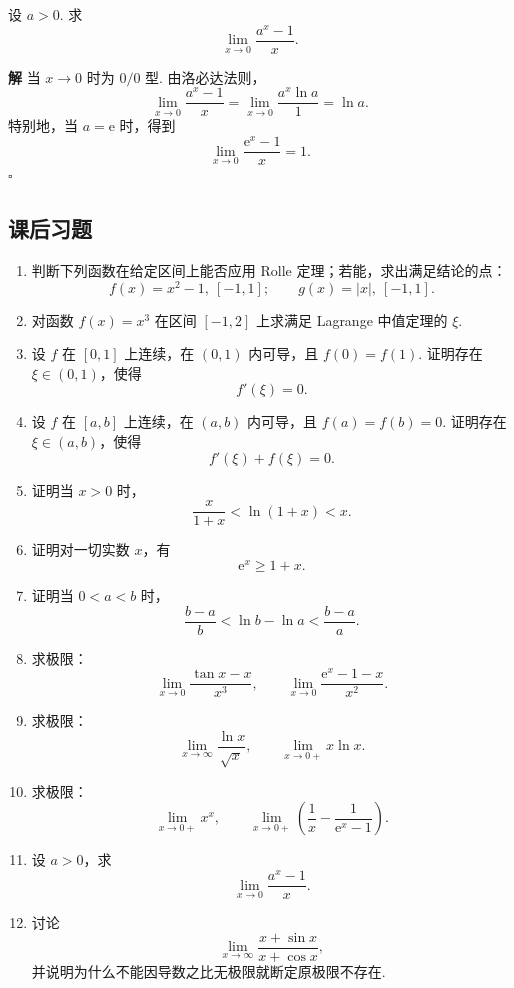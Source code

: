 \documentclass[fontset=fandol]{ctexart}
\newenvironment{solution}{\par\noindent\textbf{解}\quad}{\hfill$\square$\par\vspace{0.8em}}
\newcommand{\ee}{\mathrm{e}}
\begin{document}
\begin{example}[参数型极限]
设 $a>0$. 求
\[
\lim_{x\to0}\frac{a^x-1}{x}.
\]
\end{example}
\begin{solution}
当 $x\to0$ 时为 $0/0$ 型. 由洛必达法则，
\[
\lim_{x\to0}\frac{a^x-1}{x}
=\lim_{x\to0}\frac{a^x\ln a}{1}
=\ln a.
\]
特别地，当 $a=\ee$ 时，得到
\[
\lim_{x\to0}\frac{\ee^x-1}{x}=1.
\]
\end{solution}

\subsection{课后习题}
\begin{enumerate}[label=\textbf{练习\arabic*.},leftmargin=2.2em]
\item 判断下列函数在给定区间上能否应用 Rolle 定理；若能，求出满足结论的点：
\[
f(x)=x^2-1,\ [-1,1];\qquad
g(x)=|x|,\ [-1,1].
\]
\item 对函数 $f(x)=x^3$ 在区间 $[-1,2]$ 上求满足 Lagrange 中值定理的 $\xi$.
\item 设 $f$ 在 $[0,1]$ 上连续，在 $(0,1)$ 内可导，且 $f(0)=f(1)$. 证明存在 $\xi\in(0,1)$，使得
\[
f'(\xi)=0.
\]
\item 设 $f$ 在 $[a,b]$ 上连续，在 $(a,b)$ 内可导，且 $f(a)=f(b)=0$. 证明存在 $\xi\in(a,b)$，使得
\[
f'(\xi)+f(\xi)=0.
\]
\item 证明当 $x>0$ 时，
\[
\frac{x}{1+x}<\ln(1+x)<x.
\]
\item 证明对一切实数 $x$，有
\[
\ee^x\geq1+x.
\]
\item 证明当 $0<a<b$ 时，
\[
\frac{b-a}{b}<\ln b-\ln a<\frac{b-a}{a}.
\]
\item 求极限：
\[
\lim_{x\to0}\frac{\tan x-x}{x^3},\qquad
\lim_{x\to0}\frac{\ee^x-1-x}{x^2}.
\]
\item 求极限：
\[
\lim_{x\to\infty}\frac{\ln x}{\sqrt{x}},\qquad
\lim_{x\to0+}x\ln x.
\]
\item 求极限：
\[
\lim_{x\to0+}x^x,\qquad
\lim_{x\to0+}\left(\frac1x-\frac1{\ee^x-1}\right).
\]
\item 设 $a>0$，求
\[
\lim_{x\to0}\frac{a^x-1}{x}.
\]
\item 讨论
\[
\lim_{x\to\infty}\frac{x+\sin x}{x+\cos x},
\]
并说明为什么不能因导数之比无极限就断定原极限不存在.
\end{enumerate}
\end{document}
